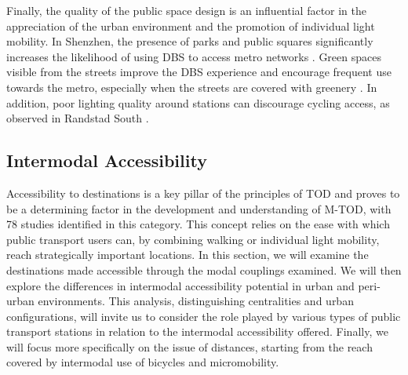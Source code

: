 \begin{refsegment}
Finally, the quality of the public space design is an influential factor in the appreciation of the urban environment and the promotion of individual light mobility. In Shenzhen, the presence of parks and public squares significantly increases the likelihood of using \acrshort{DBS} to access metro networks \textcolor{blue}{\autocite[25]{guo_dockless_2021}}. Green spaces visible from the streets improve the \acrshort{DBS} experience and encourage frequent use towards the metro, especially when the streets are covered with greenery \textcolor{blue}{\autocite[5]{wang_relationship_2020}}. In addition, poor lighting quality around stations can discourage cycling access, as observed in Randstad South \textcolor{blue}{\autocite[45-46]{la_paix_puello_modelling_2015}}.%

\subsection{Intermodal Accessibility
    \label{chap2:accessibilite-intermodale}
    }

Accessibility to destinations is a key pillar of the principles of \acrshort{TOD} and proves to be a determining factor in the development and understanding of \acrshort{M-TOD}, with 78 studies identified in this category. This concept relies on the ease with which public transport users can, by combining walking or individual light mobility, reach strategically important locations. In this section, we will examine the destinations made accessible through the modal couplings examined. We will then explore the differences in intermodal accessibility potential in urban and \gls{peri-urban} environments. This analysis, distinguishing centralities and urban configurations, will invite us to consider the role played by various types of public transport stations in relation to the intermodal accessibility offered. Finally, we will focus more specifically on the issue of distances, starting from the reach covered by intermodal use of bicycles and micromobility.%


\end{refsegment}
